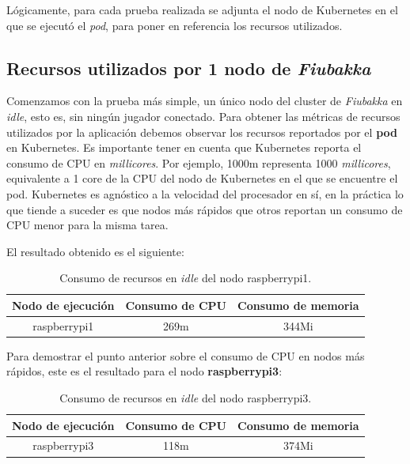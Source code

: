 Lógicamente, para cada prueba realizada se adjunta el nodo de Kubernetes en el que se ejecutó el \textit{pod}, para poner en referencia los recursos utilizados.

\subsection{Recursos utilizados por 1 nodo de \textit{Fiubakka}}

\noindent Comenzamos con la prueba más simple, un único nodo del cluster de \textit{Fiubakka} en \textit{idle}, esto es, sin ningún jugador conectado.
Para obtener las métricas de recursos utilizados por la aplicación debemos observar los recursos reportados por el \textbf{pod} en Kubernetes.
Es importante tener en cuenta que Kubernetes reporta el consumo de CPU en \textit{millicores}. Por ejemplo, 1000m representa 1000 \textit{millicores}, equivalente
a 1 core de la CPU del nodo de Kubernetes en el que se encuentre el pod. Kubernetes es agnóstico a la velocidad del procesador en sí, en la práctica lo que tiende a suceder
es que nodos más rápidos que otros reportan un consumo de CPU menor para la misma tarea.

El resultado obtenido es el siguiente:

\begin{table}[h]
\centering
\begin{tabular}{|c|c|c|}
    \hline
    \textbf{Nodo de ejecución} & \textbf{Consumo de CPU} & \textbf{Consumo de memoria} \\
    \hline
    raspberrypi1 & 269m & 344Mi \\
    \hline
\end{tabular}
\caption{Consumo de recursos en \textit{idle} del nodo raspberrypi1.}
\end{table}

Para demostrar el punto anterior sobre el consumo de CPU en nodos más rápidos, este es el resultado para el nodo \textbf{raspberrypi3}:

\begin{table}[h]
\centering
\begin{tabular}{|c|c|c|}
    \hline
    \textbf{Nodo de ejecución} & \textbf{Consumo de CPU} & \textbf{Consumo de memoria} \\
    \hline
    raspberrypi3 & 118m & 374Mi \\
    \hline
\end{tabular}
\caption{Consumo de recursos en \textit{idle} del nodo raspberrypi3.}
\end{table}

